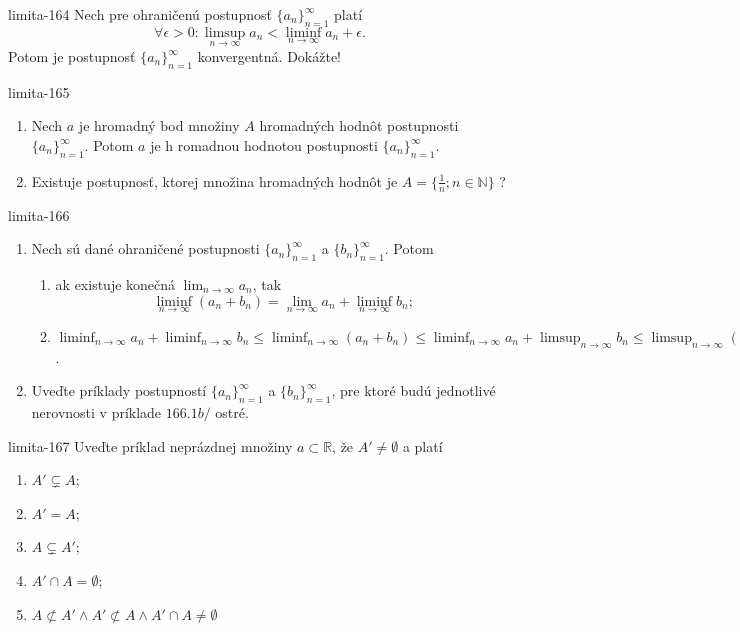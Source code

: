 \begin{defproblem}{limita-164}
Nech pre ohraničenú postupnosť ${\{a_n\}}_{n=1}^\infty$ platí $$\forall \epsilon > 0: \limsup_{n \rightarrow \infty} a_n < \liminf_{n \rightarrow \infty} a_n+\epsilon.$$ Potom je postupnosť ${\{a_n\}}_{n=1}^\infty$ konvergentná. Dokážte!
\end{defproblem}

\begin{defproblem}{limita-165}
\begin{enumerate}
\item Nech $a$ je hromadný bod množiny $A$ hromadných hodnôt postupnosti ${\{a_n\}}_{n=1}^\infty$. Potom $a$ je h romadnou hodnotou postupnosti ${\{a_n\}}_{n=1}^\infty$.
\item Existuje postupnosť, ktorej množina hromadných hodnôt je $A=\{ \frac{1}{n}; n \in \mathbb{N} \}$ ?
\end{enumerate}
\end{defproblem}

\begin{defproblem}{limita-166}
\begin{enumerate}
\item Nech sú dané ohraničené postupnosti ${\{a_n\}}_{n=1}^\infty$ a ${\{b_n\}}_{n=1}^\infty$. Potom
\begin{enumerate}
\item ak existuje konečná $\lim_{n \rightarrow \infty} a_n$, tak
$$\liminf_{n \rightarrow \infty} (a_n+b_n)=\lim_{n \rightarrow \infty} a_n+\liminf_{n \rightarrow \infty} b_n;$$
\item $\liminf_{n \rightarrow \infty} a_n+\liminf_{n \rightarrow \infty} b_n \leq \liminf_{n \rightarrow \infty} (a_n+b_n)\leq \liminf_{n \rightarrow \infty} a_n+\limsup_{n \rightarrow \infty} b_n\leq \limsup_{n \rightarrow \infty} (a_n+b_n) \leq \limsup_{n \rightarrow \infty} a_n+\limsup_{n \rightarrow \infty} b_n$.
\end{enumerate}
\item Uveďte príklady postupností ${\{a_n\}}_{n=1}^\infty$ a ${\{b_n\}}_{n=1}^\infty$, pre ktoré budú jednotlivé nerovnosti v príklade $166.1b/$ ostré.
\end{enumerate}
\end{defproblem}

\begin{defproblem}{limita-167}
Uveďte príklad neprázdnej množiny $a \subset \mathbb{R}$, že $A' \neq \emptyset$ a platí
\begin{enumerate}
\item $A' \subsetneq A$;
\item $A'=A$;
\item $A \subsetneq A'$;
\item $A' \cap A = \emptyset$;
\item $A \not\subset A'\wedge A' \not\subset A \wedge A' \cap A \neq\emptyset$
\end{enumerate}
\end{defproblem}


